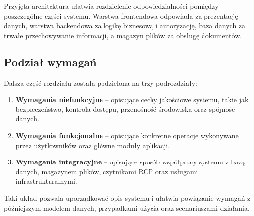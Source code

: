 Przyjęta architektura ułatwia rozdzielenie odpowiedzialności pomiędzy poszczególne części systemu. Warstwa frontendowa odpowiada za prezentację danych, warstwa backendowa za logikę biznesową i autoryzację, baza danych za trwałe przechowywanie informacji, a magazyn plików za obsługę dokumentów.

\subsection{Podział wymagań}

Dalsza część rozdziału została podzielona na trzy podrozdziały:
\begin{enumerate}
    \item \textbf{Wymagania niefunkcyjne} -- opisujące cechy jakościowe systemu, takie jak bezpieczeństwo, kontrola dostępu, przenośność środowiska oraz spójność danych.
    \item \textbf{Wymagania funkcjonalne} -- opisujące konkretne operacje wykonywane przez użytkowników oraz główne moduły aplikacji.
    \item \textbf{Wymagania integracyjne} -- opisujące sposób współpracy systemu z bazą danych, magazynem plików, czytnikami RCP oraz usługami infrastrukturalnymi.
\end{enumerate}

Taki układ pozwala uporządkować opis systemu i ułatwia powiązanie wymagań z późniejszym modelem danych, przypadkami użycia oraz scenariuszami działania.



